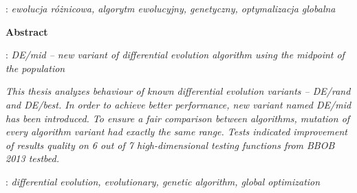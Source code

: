 \begin{titlepage}
    : {\itshape ewolucja różnicowa, algorytm ewolucyjny, genetyczny, optymalizacja globalna}
    \par
    \vspace{4\baselineskip}
    \begin{center}
	{\large\bfseries Abstract}\par\bigskip
    \end{center}
    : {\itshape DE/mid -- new variant of differential evolution algorithm using the midpoint of the population}\par
    \vspace*{1\baselineskip}
    {\itshape
This thesis analyzes behaviour of known differential evolution variants -- DE/rand and DE/best.
In order to achieve better performance, new variant named DE/mid has been introduced.
To ensure a fair comparison between algorithms, mutation of every algorithm variant had exactly
the same range. 
Tests indicated improvement of results quality on 6 out of 7 high-dimensional
testing functions from BBOB 2013 testbed.}
    \vspace*{1\baselineskip}

    : {\itshape differential evolution, evolutionary, genetic algorithm, global optimization
}

\end{titlepage}